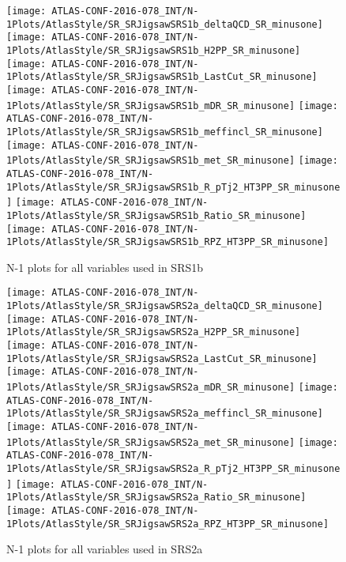 \begin{figure}[tbp]
\begin{center}
\texttt{[image: ATLAS-CONF-2016-078\_INT/N-1Plots/AtlasStyle/SR\_SRJigsawSRS1b\_deltaQCD\_SR\_minusone]}
\texttt{[image: ATLAS-CONF-2016-078\_INT/N-1Plots/AtlasStyle/SR\_SRJigsawSRS1b\_H2PP\_SR\_minusone]}
\texttt{[image: ATLAS-CONF-2016-078\_INT/N-1Plots/AtlasStyle/SR\_SRJigsawSRS1b\_LastCut\_SR\_minusone]}
\texttt{[image: ATLAS-CONF-2016-078\_INT/N-1Plots/AtlasStyle/SR\_SRJigsawSRS1b\_mDR\_SR\_minusone]}
\texttt{[image: ATLAS-CONF-2016-078\_INT/N-1Plots/AtlasStyle/SR\_SRJigsawSRS1b\_meffincl\_SR\_minusone]}
\texttt{[image: ATLAS-CONF-2016-078\_INT/N-1Plots/AtlasStyle/SR\_SRJigsawSRS1b\_met\_SR\_minusone]}
\texttt{[image: ATLAS-CONF-2016-078\_INT/N-1Plots/AtlasStyle/SR\_SRJigsawSRS1b\_R\_pTj2\_HT3PP\_SR\_minusone]}
\texttt{[image: ATLAS-CONF-2016-078\_INT/N-1Plots/AtlasStyle/SR\_SRJigsawSRS1b\_Ratio\_SR\_minusone]}
\texttt{[image: ATLAS-CONF-2016-078\_INT/N-1Plots/AtlasStyle/SR\_SRJigsawSRS1b\_RPZ\_HT3PP\_SR\_minusone]}
\end{center}
\caption{N-1 plots for all variables used in SRS1b}
\label{fig:SR_SRJigsawSRS1b_H2PP_SR_minusone}
\end{figure}

\begin{figure}[tbp]
\begin{center}
\texttt{[image: ATLAS-CONF-2016-078\_INT/N-1Plots/AtlasStyle/SR\_SRJigsawSRS2a\_deltaQCD\_SR\_minusone]}
\texttt{[image: ATLAS-CONF-2016-078\_INT/N-1Plots/AtlasStyle/SR\_SRJigsawSRS2a\_H2PP\_SR\_minusone]}
\texttt{[image: ATLAS-CONF-2016-078\_INT/N-1Plots/AtlasStyle/SR\_SRJigsawSRS2a\_LastCut\_SR\_minusone]}
\texttt{[image: ATLAS-CONF-2016-078\_INT/N-1Plots/AtlasStyle/SR\_SRJigsawSRS2a\_mDR\_SR\_minusone]}
\texttt{[image: ATLAS-CONF-2016-078\_INT/N-1Plots/AtlasStyle/SR\_SRJigsawSRS2a\_meffincl\_SR\_minusone]}
\texttt{[image: ATLAS-CONF-2016-078\_INT/N-1Plots/AtlasStyle/SR\_SRJigsawSRS2a\_met\_SR\_minusone]}
\texttt{[image: ATLAS-CONF-2016-078\_INT/N-1Plots/AtlasStyle/SR\_SRJigsawSRS2a\_R\_pTj2\_HT3PP\_SR\_minusone]}
\texttt{[image: ATLAS-CONF-2016-078\_INT/N-1Plots/AtlasStyle/SR\_SRJigsawSRS2a\_Ratio\_SR\_minusone]}
\texttt{[image: ATLAS-CONF-2016-078\_INT/N-1Plots/AtlasStyle/SR\_SRJigsawSRS2a\_RPZ\_HT3PP\_SR\_minusone]}
\end{center}
\caption{N-1 plots for all variables used in SRS2a}
\label{fig:SR_SRJigsawSRS1b_Ratio_SR_minusone}
\end{figure}

